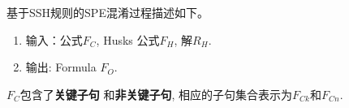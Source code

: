 %
%
%
%
%
基于SSH规则的SPE混淆过程描述如下。
\begin{enumerate}
\item[]\label{4:obsprocedure} 输入：公式$F_C$, Husks 公式$F_H$, 解$R_H$.
\item[] 输出: Formula $F_O$.
\end{enumerate}
$F_C$包含了\textbf{关键子句}
和\textbf{非关键子句},
相应的子句集合表示为\textbf{$F_{Ck}$}和\textbf{$F_{Cn}$}.

